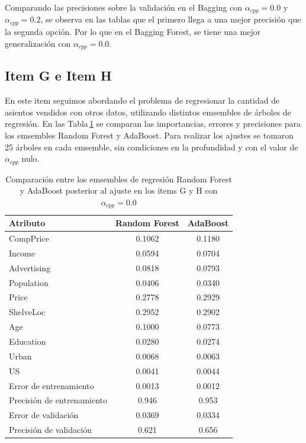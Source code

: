 Comparando las precisiones sobre la validación en el Bagging con $\alpha_{cpp}=0.0$ y $\alpha_{cpp}=0.2$, se observa en las tablas que el primero llega a una mejor precisión que la segunda opción. Por lo que en el Bagging Forest, se tiene una mejor generalización con $\alpha_{cpp}=0.0$.


\subsection*{Item G e Item H}

En este item seguimos abordando el problema de regresionar la cantidad de asientos vendidos con otros datos, utilizando distintos emsembles de árboles de regresión. En las Tabla\,\ref{tab:item_G_H} se comparan las importancias, errores y precisiones para los emsembles Random Forest y AdaBoost. Para realizar los ajustes se tomaron 25 árboles en cada emsemble, sin condiciones en la profundidad y con el valor de $\alpha_{cpp}$ nulo. 

\begin{table}[H]
	\begin{small}
		\begin{center}
			\begin{tabular}[c]{l|c|c}
				Atributo	&Random Forest	& AdaBoost	\\\hline \hline
				CompPrice   &0.1062		& 0.1180	\\ \hline
				Income      &0.0594		& 0.0704	\\ \hline
				Advertising &0.0818		& 0.0793	\\ \hline
				Population  &0.0406		& 0.0340 	\\ \hline
				Price       &0.2778		& 0.2929	\\ \hline
				ShelveLoc   &0.2952		& 0.2902	\\ \hline
				Age         &0.1000		& 0.0773	\\ \hline
				Education   &0.0280		& 0.0274 	\\ \hline
				Urban       &0.0068		& 0.0063 	\\ \hline
				US          &0.0041		& 0.0044 	\\ \hline 
				\hline
				Error de entrenamiento		&0.0013	  &0.0012 \\  \hline
				Precisión de entrenamiento 	& 0.946		&0.953  \\ \hline
				Error de validación 		& 0.0369	&0.0334  \\ \hline
				Precisión de validación 	& 0.621		& 0.656 \\\hline
			\end{tabular}
		\end{center}
	\end{small}
	\caption{Comparación entre los emsembles de regresión Random Forest  y AdaBoost  posterior al ajuste en los items G  y H con $\alpha_{cpp}=0.0$}
	\label{tab:item_G_H}
\end{table}


